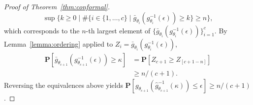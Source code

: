 \documentclass[10pt,a4paper]{amsart}
\newcommand{\Prob}{\mathbf{P}}
\newcommand{\cardinality}{\#}
\newcommand{\lt}{\kappa}
\newcommand{\ncalib}{c}
\newcommand{\param}{\theta}
\newcommand{\predgap}{\hat{g}}
\newcommand{\rollmin}{\bar{g}}
\newcommand{\tol}{\epsilon}
\newcommand{\truegap}{g}
\begin{document}
\begin{proof}[Proof of Theorem~\ref{thm:conformal}]
\begin{equation*}
        \sup\{k \ge 0 \mid \cardinality\{i \in \{1, \dots, \ncalib\} \mid \rollmin_{\param_i}(\truegap_{\param_i}^{-1}(\tol)) \ge k \} \ge n \},
    \end{equation*}
    which corresponds to the $n$-th largest element of $\{\rollmin_{\param_i}(\truegap_{\param_i}^{-1}(\tol))\}_{i=1}^\ncalib$.
    By Lemma~\ref{lemma:ordering} applied to $Z_i = \rollmin_{\param_i}(\truegap^{-1}_{\param_i}(\tol))$,
    \begin{align*}
    \Prob[\rollmin_{\param_{\ncalib+1}}(\truegap^{-1}_{\param_{\ncalib + 1}}(\tol)) \ge \lt] &= \Prob[Z_{\ncalib + 1} \ge Z_{[\ncalib + 1 - n]}] \\ & \ge n / (\ncalib + 1).
    \end{align*}
    Reversing the equivalences above yields $\Prob[\truegap_{\param_{\ncalib+1}}(\predgap^{-1}_{\param_{\ncalib+1}}(\lt)) \le \tol] \ge n/(\ncalib + 1)$.
\end{proof}
\end{document}
